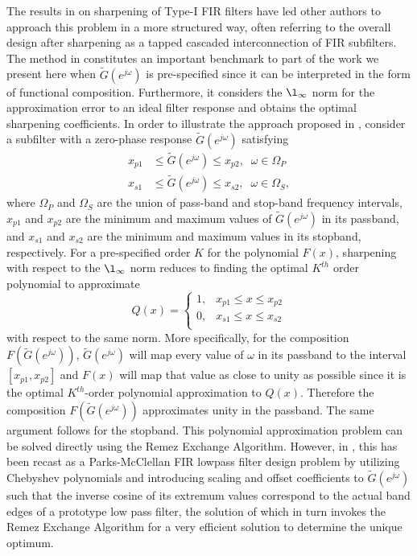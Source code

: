 \documentclass[journal] {IEEEtran}
\begin{document}
The results in \cite{Kaiser1977} on sharpening of Type-I FIR filters have led other authors \cite{Nakamura, Saramaki, Hartnett1995, Chen, Saramaki2006, Saramaki2009, Samadi2000} to approach this problem in a more structured way, often referring to the overall design after sharpening as a tapped cascaded interconnection of FIR subfilters. The method in \cite{Saramaki} constitutes an important benchmark to part of the work we present here when $\tilde{G}(e^{j\omega})$ is pre-specified since it can be interpreted in the form of functional composition. Furthermore, it considers the $\l_{\infty}$ norm for the approximation error to an ideal filter response and obtains the optimal sharpening coefficients. In order to illustrate the approach proposed in \cite{Saramaki}, consider a subfilter with a zero-phase response $\tilde{G}(e^{j\omega})$ satisfying
\begin{subequations}\label{eqn:framework::mapping}
\begin{align}
x_{p1}&\le \tilde{G}(e^{j\omega}) \le x_{p2}, \;\; \omega\in \Omega_P \label{eqn:framewok::subfilter_spec_pass}\\
x_{s1}&\le \tilde{G}(e^{j\omega}) \le x_{s2}, \;\; \omega\in \Omega_S \label{eqn:framewok::subfilter_spec_stop},
\end{align}
\end{subequations}
where $\Omega_P$ and $\Omega_S$ are the union of pass-band and stop-band frequency intervals, $x_{p1}$ and $x_{p2}$ are the minimum and maximum values of $\tilde{G}(e^{j\omega})$ in its passband, and $x_{s1}$ and $x_{s2}$ are the minimum and maximum values in its stopband, respectively. For a pre-specified order $K$ for the polynomial $F(x)$, sharpening with respect to the $\l_{\infty}$ norm reduces to finding the optimal $K^{th}$ order polynomial to approximate
\begin{equation}\label{eqn:SaramakiQ}
Q(x)=\left\{\begin{array}{lr}
1, & x_{p1} \le x \le x_{p2}\\
0,& x_{s1}\le x \le x_{s2}\\
\end{array} \right.
\end{equation}
with respect to the same norm. More specifically, for the composition $F(\tilde{G}(e^{j\omega}))$, $\tilde{G}(e^{j\omega})$ will map every value of $\omega$ in its passband to the interval $[x_{p1},x_{p2}]$ and $F(x)$ will map that value as close to unity as possible since it is the optimal $K^{th}$-order polynomial approximation to $Q(x)$. Therefore the composition $F(\tilde{G}(e^{j\omega}))$ approximates unity in the passband. The same argument follows for the stopband. This polynomial approximation problem can be solved directly using the Remez Exchange Algorithm. However, in \cite{Saramaki}, this has been recast as a Parks-McClellan FIR lowpass filter design problem by utilizing Chebyshev polynomials and introducing scaling and offset coefficients to $\tilde{G}(e^{j\omega})$ such that the inverse cosine of its extremum values correspond to the actual band edges of a prototype low pass filter, the solution of which in turn invokes the Remez Exchange Algorithm for a very efficient solution to determine the unique optimum.
\end{document}
